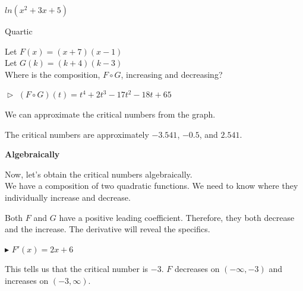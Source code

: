 \documentclass{ximera}
\begin{document}
\begin{example}   $ln(x^2 + 3x + 5)$




\end{example}



















\begin{example}   Quartic



Let $F(x) = (x+7)(x-1)$ \\


Let $G(k) = (k+4)(k-3)$ \\



Where is the composition, $F \circ G$, increasing and decreasing?


$\vartriangleright$   $(F \circ G)(t) = t^4 +2 t^3 -17 t^2 - 18 t + 65$





We can approximate the critical numbers from the graph.



\begin{center}
\end{center}


The critical numbers are approximately $-3.541$, $-0.5$, and $2.541$.


\textbf{\textcolor{red!70!black}{Algebraically}}


Now, let's obtain the critical numbers algebraically. \\


We have a composition of two quadratic functions.  We need to know where they individually increase and decrease.

Both $F$ and $G$ have a positive leading coefficient.  Therefore, they both decrease and the increase. The derivative will reveal the specifics.



$\blacktriangleright$  $F'(x) = 2x + 6$

This tells us that the critical number is $-3$.  $F$ decreases on $(-\infty, -3)$ and increases on $(-3, \infty)$.


\end{example}
\end{document}

